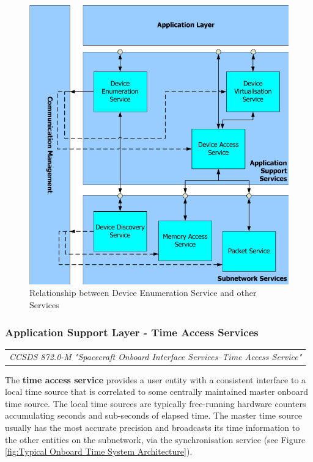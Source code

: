 \begin{figure}[h]
\centering\includegraphics[scale=0.3]{fig/relationship_between_device_enumeration_service_and_other_services}
\caption{Relationship between Device Enumeration Service and other Services}
\label{fig:Relationship between Device Enumeration Service and other Services}
\end{figure}

\subsubsection{Application Support Layer - Time Access Services}

\begin{tabular}{l}
\textit{CCSDS 872.0-M "Spacecraft Onboard Interface Services--Time Access Service" \cite{}} 
\end{tabular}

The \textbf{time access service} provides a user entity with a consistent interface to a local time source that is correlated to some centrally maintained master onboard time source. The local time sources are typically free-running hardware counters accumulating seconds and sub-seconds of elapsed time. The master time source usually has the most accurate precision and broadcasts its time information to the other entities on the subnetwork, via the synchronisation service (see Figure \ref{fig:Typical Onboard Time System Architecture}). 


